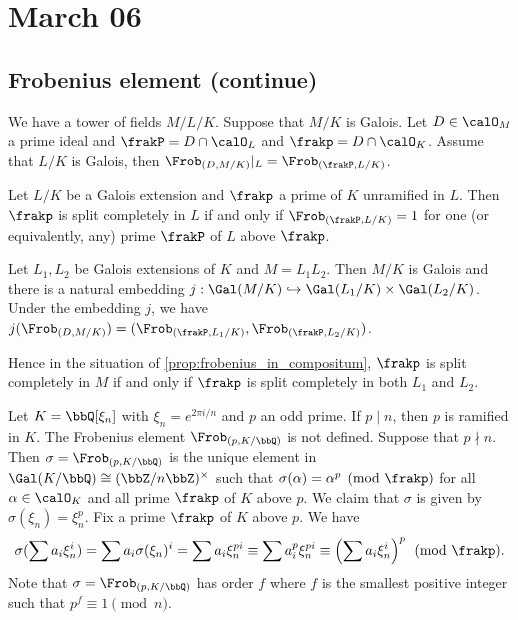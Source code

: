 \section{March 06}

\subsection{Frobenius element (continue)}

    \begin{proposition}
        We have a tower of fields \(M/L/K\).
        Suppose that \(M/K\) is Galois.
        Let \(D \in \calO_M\) a prime ideal and \(\frakP = D \cap \calO_L\) and \(\frakp = D \cap \calO_K\).
        Assume that \(L/K\) is Galois, then \(\Frob_{(D, M/K)}|_L = \Frob_{(\frakP, L/K)}\).
    \end{proposition}

    \begin{corollary}\label{cor:split_completely_and_frobenius}
        Let \(L/K\) be a Galois extension and \(\frakp\) a prime of \(K\) unramified in \(L\).
        Then 
        \(\frakp\) is split completely in \(L\) if and only if \(\Frob_{(\frakP, L/K)} = 1\) for one (or equivalently, any) prime \(\frakP\) of \(L\) above \(\frakp\).
    \end{corollary}

    \begin{proposition}\label{prop:frobenius_in_compositum}
        Let \(L_1, L_2\) be Galois extensions of \(K\) and \(M=L_1L_2\).
        Then \(M/K\) is Galois and there is a natural embedding \(j:\Gal(M/K) \hookrightarrow \Gal(L_1/K) \times \Gal(L_2/K)\).
        Under the embedding \(j\), we have \(j(\Frob_{(D, M/K)}) = (\Frob_{(\frakP, L_1/K)}, \Frob_{(\frakP, L_2/K)})\).
    \end{proposition}

    Hence in the situation of \cref{prop:frobenius_in_compositum}, \(\frakp\) is split completely in \(M\) if and only if \(\frakp\) is split completely in both \(L_1\) and \(L_2\).

    \begin{example}
        Let \(K = \bbQ[\xi_n]\) with \(\xi_n = e^{2\pi i/n}\) and \(p\) an odd prime.
        If \(p \mid n\), then \(p\) is ramified in \(K\).
        The Frobenius element \(\Frob_{(p, K/\bbQ)}\) is not defined.
        Suppose that \(p \nmid n\).
        Then \(\sigma = \Frob_{(p, K/\bbQ)}\) is the unique element in \(\Gal(K/\bbQ) \cong (\bbZ/n\bbZ)^\times\) 
        such that \(\sigma(\alpha) = \alpha^p \pmod{\frakp}\) for all \(\alpha \in \calO_K\) and all prime \(\frakp\) of \(K\) above \(p\).
        We claim that \(\sigma\) is given by \(\sigma(\xi_n) = \xi_n^p\).
        Fix a prime \(\frakp\) of \(K\) above \(p\).
        We have 
        \[ \sigma(\sum a_i \xi_n^i) = \sum a_i \sigma(\xi_n)^i = \sum a_i \xi_n^{pi} \equiv \sum a_i^p \xi_n^{pi} \equiv \left(\sum a_i \xi_n^i\right)^p \pmod{\frakp}. \]
        Note that \(\sigma = \Frob_{(p, K/\bbQ)}\) has order \(f\) where \(f\) is the smallest positive integer such that \(p^f \equiv 1 \pmod{n}\).
    \end{example}

